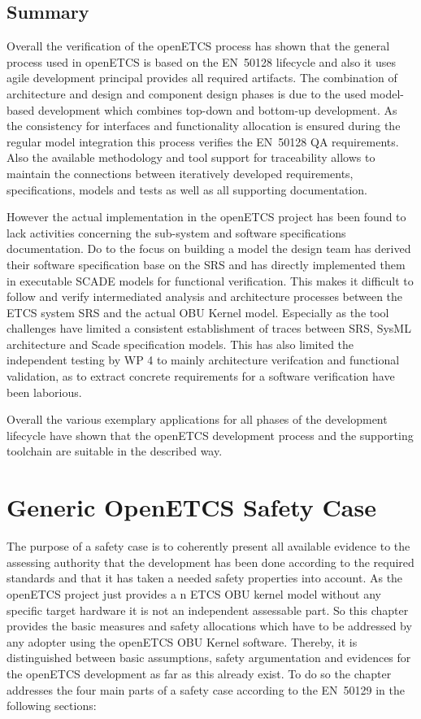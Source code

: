 \documentclass{template/openetcs_report}
\begin{document}
\section{Summary}
\label{summary-process}

Overall the verification of the openETCS process has shown that the general process used in openETCS is based on the EN~50128 lifecycle and also it uses agile development principal provides all required artifacts. The combination of architecture and design and component design phases is due to the used model-based development which combines top-down and bottom-up development. As the consistency for interfaces and functionality allocation is ensured during the regular model integration this process verifies the EN~50128 QA requirements. Also the available methodology and tool support for traceability allows to maintain the connections between iteratively developed requirements, specifications, models and tests as well as all supporting documentation.

However the actual implementation in the openETCS project has been found to lack activities concerning  the sub-system and software specifications documentation. Do to the focus on building a model the design team has derived their software specification base on the SRS and has directly implemented them in executable SCADE models for functional verification. This makes it difficult to follow and verify intermediated analysis and architecture processes between the ETCS system SRS and the actual OBU Kernel model. Especially as the tool challenges have limited a consistent establishment of traces between SRS, SysML architecture and Scade specification models. This has also limited the independent testing by WP 4 to mainly architecture verifcation and functional validation, as to extract concrete requirements for a software verification have been laborious. 

Overall the various exemplary applications for all phases of the development lifecycle have shown that the openETCS development process and the supporting toolchain are suitable in the described way. 


\chapter{Generic OpenETCS Safety Case}
\label{sec:safetycase}

The purpose of a safety case is to coherently present all available evidence to the assessing authority that the development has been done according to the required standards and that it has taken a needed safety properties into account. As the openETCS project just provides a n ETCS OBU kernel model without any specific target hardware it is not an independent assessable part. So this chapter provides the basic measures and safety allocations which have to be addressed by any adopter using the openETCS OBU Kernel software. Thereby, it is distinguished between basic assumptions, safety argumentation and evidences for the openETCS development as far as this already exist. To do so the chapter addresses the four main parts of a safety case according to the EN~50129 in the following sections:
\end{document}
